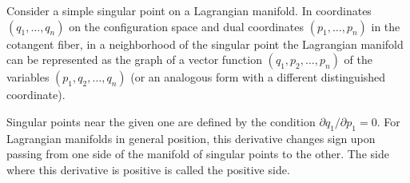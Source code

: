 Consider a simple singular point on a Lagrangian manifold. In coordinates $(q_1, \ldots, q_n)$ on the configuration space and dual coordinates $(p_1, \ldots, p_n)$ in the cotangent fiber, in a neighborhood of the singular point the Lagrangian manifold can be represented as the graph of a vector function $(q_1, p_2, \ldots, p_n)$ of the variables $(p_1, q_2, \ldots, q_n)$ (or an analogous form with a different distinguished coordinate).

Singular points near the given one are defined by the condition $\partial q_1 / \partial p_1 = 0$. For Lagrangian manifolds in general position, this derivative changes sign upon passing from one side of the manifold of singular points to the other. The side where this derivative is positive is called the positive side.
